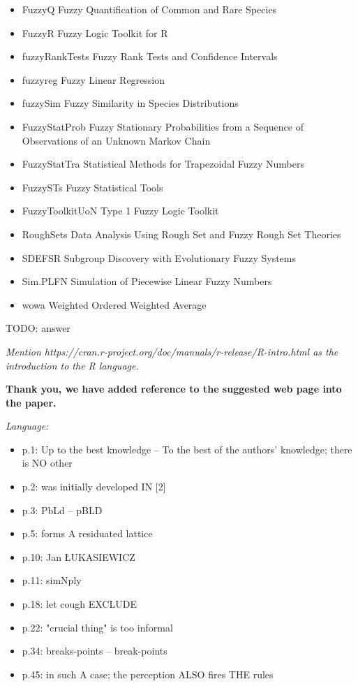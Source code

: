 \documentclass{article}
\newcommand{\todo}[1]{{\color{red} TODO: #1}}
\begin{document}
{\begin{itemize}
    \item FuzzyQ Fuzzy Quantification of Common and Rare Species
    \item FuzzyR Fuzzy Logic Toolkit for R
    \item fuzzyRankTests Fuzzy Rank Tests and Confidence Intervals
    \item fuzzyreg Fuzzy Linear Regression
    \item fuzzySim Fuzzy Similarity in Species Distributions
    \item FuzzyStatProb Fuzzy Stationary Probabilities from a Sequence of Observations of an Unknown Markov Chain
    \item FuzzyStatTra Statistical Methods for Trapezoidal Fuzzy Numbers
    \item FuzzySTs Fuzzy Statistical Tools
    \item FuzzyToolkitUoN Type 1 Fuzzy Logic Toolkit
    \item RoughSets Data Analysis Using Rough Set and Fuzzy Rough Set Theories
    \item SDEFSR Subgroup Discovery with Evolutionary Fuzzy Systems
    \item Sim.PLFN Simulation of Piecewise Linear Fuzzy Numbers
    \item wowa Weighted Ordered Weighted Average
\end{itemize} }

\todo{answer}

{ \it Mention https://cran.r-project.org/doc/manuals/r-release/R-intro.html as the introduction to the R language. }

{ \bf Thank you, we have added reference to the suggested web page into the paper.}

{ \it Language:
\begin{itemize}
    \item p.1: Up to the best knowledge -- To the best of the authors' knowledge; there is NO other
    \item p.2: was initially developed IN [2]
    \item p.3: PbLd -- pBLD
    \item p.5: forms A residuated lattice
    \item p.10: Jan ŁUKASIEWICZ
    \item p.11: simNply
    \item p.18: let cough EXCLUDE
    \item p.22: "crucial thing" is too informal
    \item p.34: breaks-points -- break-points
    \item p.45: in such A case; the perception ALSO fires THE rules
\end{itemize} }
\end{document}
